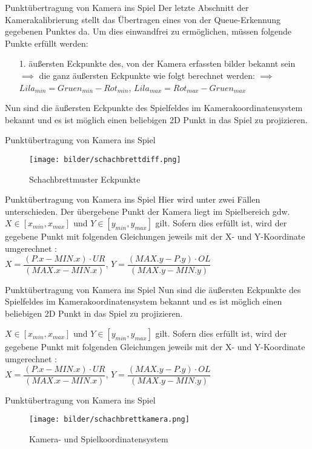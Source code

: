 \begin{frame}{Punktübertragung von Kamera ins Spiel}
	Der letzte Abschnitt der Kamerakalibrierung stellt das Übertragen eines von der Queue-Erkennung gegebenen Punktes da. Um dies einwandfrei zu ermöglichen, müssen folgende Punkte erfüllt werden:
	\begin{itemize}
		\item[1.] äußersten Eckpunkte des, von der Kamera erfassten bilder bekannt sein\\
		$\implies$ die ganz äußersten Eckpunkte wie folgt berechnet werden:
		$\implies$ $Lila_{min} = Gruen_{min} - Rot_{min}$, $Lila_{max} = Rot_{max} - Gruen_{max}$
		\pause
	\end{itemize}
	Nun sind die äußersten Eckpunkte des Spielfeldes im Kamerakoordinatensystem bekannt und es ist möglich einen beliebigen 2D Punkt in das Spiel zu projizieren.
	
\end{frame}

\begin{frame}{Punktübertragung von Kamera ins Spiel}
		\begin{figure}[h]
		\centering
		\texttt{[image: bilder/schachbrettdiff.png]}
		\caption{Schachbrettmuster Eckpunkte}
	\end{figure}
\end{frame}

\begin{frame}{Punktübertragung von Kamera ins Spiel}
	Hier wird unter zwei Fällen unterschieden. Der übergebene Punkt der Kamera liegt im Spielbereich gdw. $X \in [x_{min}, x_{max}]$ und $Y \in [y_{min},y_{max}]$ gilt.
	Sofern dies erfüllt ist, wird der gegebene Punkt mit folgenden Gleichungen jeweils mit der X- und Y-Koordinate umgerechnet :\\
	$X = \dfrac{(P.x - MIN.x) \cdot UR}{(MAX.x - MIN.x)}$, 
	$Y = \dfrac{(MAX.y - P.y) \cdot OL}{(MAX.y - MIN.y)}$
\end{frame}

\begin{frame}{Punktübertragung von Kamera ins Spiel}
	Nun sind die äußersten Eckpunkte des Spielfeldes im Kamerakoordinatensystem bekannt und es ist möglich einen beliebigen 2D Punkt in das Spiel zu projizieren.
	
	$X \in [x_{min}, x_{max}]$ und $Y \in [y_{min},y_{max}]$ gilt.
	Sofern dies erfüllt ist, wird der gegebene Punkt mit folgenden Gleichungen jeweils mit der X- und Y-Koordinate umgerechnet :\\
	$X = \dfrac{(P.x - MIN.x) \cdot UR}{(MAX.x - MIN.x)}$, 
	$Y = \dfrac{(MAX.y - P.y) \cdot OL}{(MAX.y - MIN.y)}$
	
\end{frame}

\begin{frame}{Punktübertragung von Kamera ins Spiel}
	\begin{figure}[h]
		\centering
		\texttt{[image: bilder/schachbrettkamera.png]}
		\caption{Kamera- und Spielkoordinatensystem}
	\end{figure}
\end{frame}